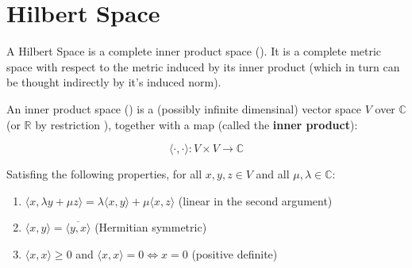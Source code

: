 
\section{Hilbert Space}

A Hilbert Space is a complete inner product space (\citet{HS-YN:11}). It is a
complete metric space with respect to the metric induced by its inner product
(which in turn can be thought indirectly by it's induced norm).

An inner product space (\citet{HS-HJNB:00}) is a (possibly infinite dimensinal)
vector space $V$ over $\mathbb{C}$ (or $\mathbb{R}$ by restriction ), together with a map (called the
\textbf{inner product}):

\[  \langle\cdot,\cdot\rangle: V \times V \to \mathbb{C} \]

Satisfing the following properties, for all $x,y,z \in V$ and all $\mu, \lambda
\in \mathbb{C}$:

\begin{enumerate}[I]
  \item \(  \langle x,\lambda y + \mu z  \rangle = \lambda\langle	 x,y\rangle +
  \mu \langle x,z \rangle \) (linear in the second argument)
  \item \( \langle x,y \rangle = \overline{\langle y,x \rangle } \) (Hermitian
  symmetric)
  \item  \( \langle x,x \rangle \geq 0 \) and \( \langle x,x \rangle = 0
  \Leftrightarrow x = 0 \) (positive definite)
\end{enumerate}
